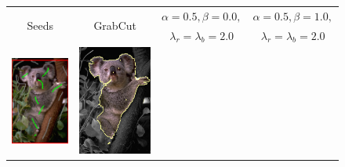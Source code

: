 \begin{figure}[]
\center
\begin{tabular}{cccc}
\multirow{2}{*}{Seeds} & \multirow{2}{*}{GrabCut} & $\alpha=0.5, \beta=0.0,$ & $\alpha=0.5, \beta=1.0,$\\
& & $\lambda_r=\lambda_b=2.0$ & $\lambda_r=\lambda_b=2.0$\\
 	\includegraphics[scale=0.25]{figures/chapter8/segmentation/coala/k-0.0/seeds.png} & 
 	\includegraphics[scale=0.25]{figures/chapter8/segmentation/coala/k-0.0/gc-seg.png} &  	

\end{tabular}
\end{figure}
